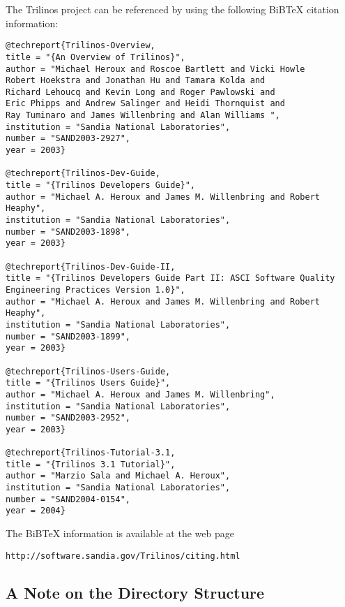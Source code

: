 The Trilinos project can be referenced by using the following BiBTeX
citation information:
\begin{verbatim}
@techreport{Trilinos-Overview,
title = "{An Overview of Trilinos}",
author = "Michael Heroux and Roscoe Bartlett and Vicki Howle
Robert Hoekstra and Jonathan Hu and Tamara Kolda and
Richard Lehoucq and Kevin Long and Roger Pawlowski and
Eric Phipps and Andrew Salinger and Heidi Thornquist and
Ray Tuminaro and James Willenbring and Alan Williams ",
institution = "Sandia National Laboratories",
number = "SAND2003-2927",
year = 2003}

@techreport{Trilinos-Dev-Guide,
title = "{Trilinos Developers Guide}",
author = "Michael A. Heroux and James M. Willenbring and Robert Heaphy",
institution = "Sandia National Laboratories",
number = "SAND2003-1898",
year = 2003}

@techreport{Trilinos-Dev-Guide-II,
title = "{Trilinos Developers Guide Part II: ASCI Software Quality
Engineering Practices Version 1.0}",
author = "Michael A. Heroux and James M. Willenbring and Robert Heaphy",
institution = "Sandia National Laboratories",
number = "SAND2003-1899",
year = 2003}

@techreport{Trilinos-Users-Guide,
title = "{Trilinos Users Guide}",
author = "Michael A. Heroux and James M. Willenbring",
institution = "Sandia National Laboratories",
number = "SAND2003-2952",
year = 2003}

@techreport{Trilinos-Tutorial-3.1,
title = "{Trilinos 3.1 Tutorial}",
author = "Marzio Sala and Michael A. Heroux",
institution = "Sandia National Laboratories",
number = "SAND2004-0154",
year = 2004}
\end{verbatim}
The BiBTeX information is available at the web page
\begin{verbatim}
http://software.sandia.gov/Trilinos/citing.html
\end{verbatim}


\subsection{A Note on the Directory Structure}
\label{sec:into_note}

